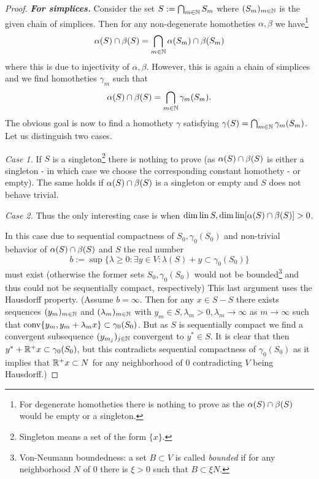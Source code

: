 \documentclass{article}
\begin{document}
\begin{proof}
\textbf{\emph{For simplices.}} Consider the set $S:=\bigcap_{m\in\mathbb{N}}{S_m}$ where $(S_m)_{m\in\mathbb{N}}$ is the given chain of simplices. Then for any non-degenerate homotheties $\alpha,\beta$ we have\footnote{For degenerate homotheties there is nothing to prove as the $\alpha(S)\cap\beta(S)$ would be empty or a singleton.}
\begin{equation}
\alpha(S)\cap\beta(S)=\bigcap_{m\in\mathbb{N}}{\alpha(S_m)\cap\beta(S_m)}
\end{equation}
where this is due to injectivity of $\alpha,\beta$. However, this is again a chain of simplices and we find homotheties $\gamma_m$ such that
\begin{equation}
\alpha(S)\cap\beta(S)=\bigcap_{m\in\mathbb{N}}{\gamma_m(S_m)}\text{.}
\end{equation}
The obvious goal is now to find a homothety $\gamma$ satisfying $\gamma(S)=\bigcap_{m\in\mathbb{N}}{\gamma_m(S_m)}$. Let us distinguish two cases. 

\emph{Case 1.} If $S$ is a singleton\footnote{Singleton means a set of the form $\{x\}$.} there is nothing to prove (as $\alpha(S)\cap\beta(S)$ is either a singleton - in which case we choose the corresponding constant homothety - or empty).
The same holds if $\alpha(S)\cap\beta(S)$ is a singleton or empty and $S$ does not behave trivial.

\emph{Case 2.} Thus the only interesting case is when $\dim\operatorname{lin}{S},\dim\operatorname{lin}[\alpha(S)\cap\beta(S)]>0$.

In this case due to sequential compactness of $S_0, \gamma_0(S_0)$ and non-trivial behavior of $\alpha(S)\cap\beta(S)$  and $S$ the real number 
\begin{equation}
b :=\sup\{\lambda\geq 0:\exists y\in V:\lambda(S)+y\subset \gamma_0(S_0)\}
\end{equation}
 must exist (otherwise the former sets $S_0, \gamma_0(S_0)$ would not be bounded\footnote{Von-Neumann boundedness: a set $B\subset V$ is called \emph{bounded} if for any neighborhood $N$ of $0$ there is $\xi>0$ such that $B\subset \xi N$.} and thus could not be sequentially compact, respectively) This last argument uses the Hausdorff property. (Assume $b=\infty$. Then for any $x\in S-S$ there exists sequences $(y_m)_{m\in\mathbb{N}}$ and $(\lambda_m)_{m\in\mathbb{N}}$ with $y_m\in S,\lambda_m>0,\lambda_m\to\infty$ as $ m\to\infty$ such that $\operatorname{conv}\{y_m,y_m+\lambda_m x\}\subset \gamma_0(S_0)$. But as $S$ is sequentially compact we find a convergent subsequence $(y_{m_j})_{j\in\mathbb{N}}$ convergent to $y^*\in S$. It is clear that then $y^*+\mathbb{R}^+ x\subset \gamma_0(S_0)$, but this contradicts sequential compactness of $\gamma_0(S_0)$ as it implies that $\mathbb{R}^+ x\subset N$ for any neighborhood of 0 contradicting $V$ being Hausdorff.)  


\end{proof}
\end{document}

